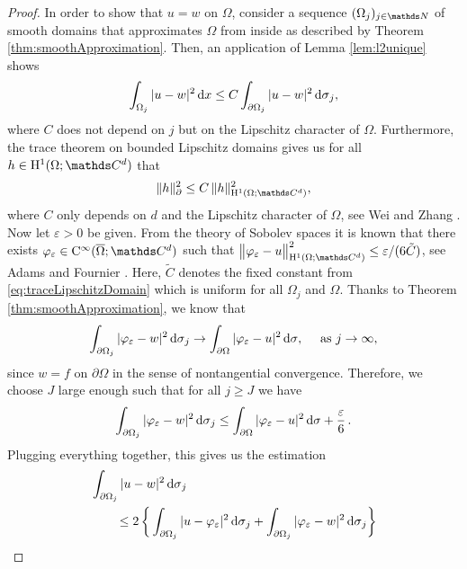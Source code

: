 \begin{proof}
  In order to show that $u = w$ on $\Omega$, consider a sequence $(\Omega_j)_{j \in \N}$ of smooth domains that approximates $\Omega$ from inside as described by Theorem \ref{thm:smoothApproximation}.
  Then, an application of Lemma \ref{lem:l2unique} shows
  \begin{align}
    \label{eq:reverseTraceUnique}
    \int_{\Omega_j} |u - w|^2 \, {\operatorname{d}\!{x}} \leq C \int_{\partial\Omega_j} |u - w|^2 \, {\operatorname{d}\!{\sigma}}_j,
  \end{align}
  where $C$ does not depend on $j$ but on the Lipschitz character of $\Omega$.
  Furthermore, the trace theorem on bounded Lipschitz domains gives us for all $h \in \HH^1(\Omega; \C^d)$ that
  \begin{align}
    \label{eq:traceLipschitzDomain}
     \|h\|_\partial^2 \leq C\, \|h\|_{\HH^1(\Omega; \C^d)}^2,
  \end{align}
  where $C$ only depends on $d$ and the Lipschitz character of $\Omega$, see Wei and Zhang \cite[Lem.\@~2.2]{weiZhang}.
  Now let $\varepsilon > 0$ be given. 
  From the theory of Sobolev spaces it is known that there exists $\varphi_\varepsilon \in \CC^\infty(\overline\Omega; \C^d)$ such that $\big\|\varphi_\varepsilon - u\big\|_{\HH^1(\Omega; \C^d)}^2 \leq {\varepsilon}/({6 \tilde C})$, see Adams and Fournier \cite[Thm.\@~3.18]{adams}.
  Here, $\tilde C$ denotes the fixed constant from \eqref{eq:traceLipschitzDomain} which is uniform for all $\Omega_j$ and $\Omega$.
  Thanks to Theorem \ref{thm:smoothApproximation}, we know that 
  \begin{align*}
    \int_{\partial\Omega_j} |\varphi_\varepsilon - w|^2 \, {\operatorname{d}\!{\sigma}}_j \to \int_{\partial\Omega} |\varphi_\varepsilon - u|^2 \, {\operatorname{d}\!{\sigma}}, \quad \text{ as } j \to \infty,
  \end{align*}
  since $w = f$ on $\partial\Omega$ in the sense of nontangential convergence.
  Therefore, we choose $J$ large enough such that for all $j \geq J$ we have
  \begin{align*}
    \int_{\partial\Omega_j} |\varphi_\varepsilon - w|^2 \, {\operatorname{d}\!{\sigma}}_j \leq \int_{\partial\Omega} |\varphi_\varepsilon - u|^2 \, {\operatorname{d}\!{\sigma}} + \frac{\varepsilon}{6}\,.
  \end{align*}
  Plugging everything together, this gives us the estimation
  \begin{align*}
    &\int_{\partial\Omega_j} |u - w|^2 \d\sigma_j  \\
    &\qquad\leq 2 \, \bigg\{ \int_{\partial\Omega_j} |u - \varphi_\varepsilon |^2 \d\sigma_j + \int_{\partial\Omega_j} |\varphi_\varepsilon - w|^2 \d\sigma_j \bigg\}

\end{align*}
\end{proof}
